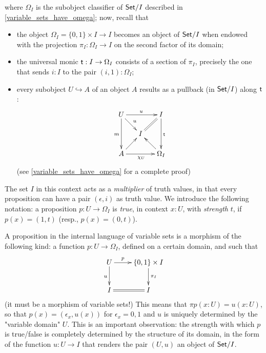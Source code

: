 where $\Omega_I$ is the subobject classifier of $\mathsf{Set}/I$ described in \autoref{variable_sets_have_omega}; now, recall that
\begin{itemize}
	\item the object $\Omega_I = \{0,1\}\times I \to I$ becomes an object of $\mathsf{Set}/I$ when endowed with the projection $\pi_I : \Omega_I \to I$ on the second factor of its domain;
	\item the universal monic $\textsf{t} : I \to \Omega_I$ consists of a section of $\pi_I$, precisely the one that sends $i : I$ to the pair $(i,1) : \Omega_I$;
	\item every subobject $U \hookrightarrow A$ of an object $A$ results as a pullback (in $\mathsf{Set}/I$) along $\textsf{t}$:
	      \[\xymatrix@R=5mm@C=5mm{
		      U\ar[dr]^u\ar[rr]^u\ar[dd]_m&& I\ar[dd]^{\tr} \ar@{=}[dl]\\
		      &I& \\
		      A \ar[ur]\ar[rr]_{\chi_U}&& \ar[ul]\Omega_I
		      }\]
	      (see \autoref{variable_sets_have_omega} for a complete proof)
\end{itemize}
The set $I$ in this context acts as a \emph{multiplier} of truth values, in that every proposition can have a pair $(\epsilon, i)$ as truth value. We introduce the following notation: a proposition $p : U \to \Omega_I$ is \emph{true}, in context $x :U$, with \emph{strength} $t$, if $p(x) =(1,t)$ (resp., $p(x)=(0,t)$).
\begin{remark}\label{very_importanta_force}
	A proposition in the internal language of variable sets is a morphism of the following kind: a function $p : U \to \Omega_I$, defined on a certain domain, and such that
	\[
		\xymatrix{
			U\ar[d]_u\ar[r]^-p  & \{0,1\}\times I \ar[d]^{\pi_I}\\
			I \ar@{=}[r]& I
		}
	\]
	(it must be a morphism of variable sets!) This means that $\pi p(x : U) = u(x : U)$, so that $p(x) = (\epsilon_x, u(x))$ for $\epsilon_x =0,1$ and $u$ is uniquely determined by the "variable domain" $U$. This is an important observation: the strength with which $p$ is true/false is completely determined by the structure of its domain, in the form of the function $u : U \to I$ that renders the pair $(U,u)$ an object of $\mathsf{Set}/I$.
\end{remark}

